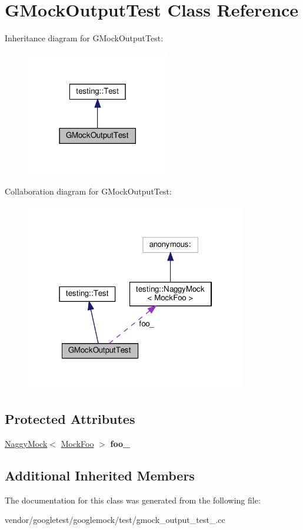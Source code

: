 \hypertarget{class_g_mock_output_test}{}\section{G\+Mock\+Output\+Test Class Reference}
\label{class_g_mock_output_test}


Inheritance diagram for G\+Mock\+Output\+Test\+:
\nopagebreak
\begin{figure}[H]
\begin{center}
\leavevmode
\includegraphics[width=177pt]{class_g_mock_output_test__inherit__graph}
\end{center}
\end{figure}


Collaboration diagram for G\+Mock\+Output\+Test\+:
\nopagebreak
\begin{figure}[H]
\begin{center}
\leavevmode
\includegraphics[width=274pt]{class_g_mock_output_test__coll__graph}
\end{center}
\end{figure}
\subsection*{Protected Attributes}
\begin{DoxyCompactItemize}
\item 
\mbox{\label{class_g_mock_output_test_aed97d2ca515d69466968c60575cc18a2}} 
\hyperlink{classtesting_1_1_naggy_mock}{Naggy\+Mock}$<$ \hyperlink{class_mock_foo}{Mock\+Foo} $>$ {\bfseries foo\+\_\+}
\end{DoxyCompactItemize}
\subsection*{Additional Inherited Members}


The documentation for this class was generated from the following file\+:\begin{DoxyCompactItemize}
\item 
vendor/googletest/googlemock/test/gmock\+\_\+output\+\_\+test\+\_\+.\+cc\end{DoxyCompactItemize}
